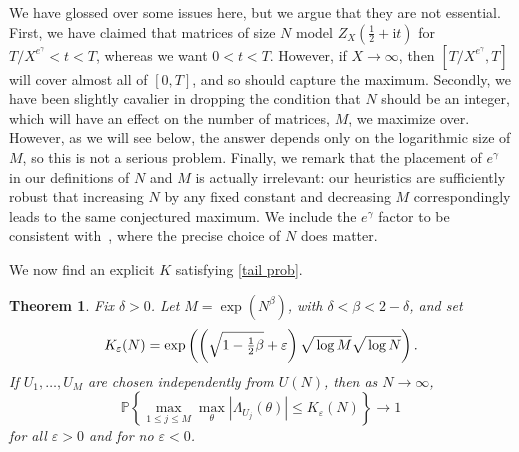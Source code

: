 \documentclass[10pt,reqno,twoside]{amsart}
\renewcommand{\i}{{\mathrm{i}}} %
\newcommand{\Prob}{\mathbb{P}}
\newtheorem{theorem}{Theorem}[section]
\numberwithin{equation}{section}
\numberwithin{theorem}{section}
\begin{document}
{{We have glossed over some issues here, but we argue that they are
not essential. First, we have claimed that matrices of size $N$
model $Z_X(\frac12+ \i t)$ for   $T /X^{e^\gamma} < t< T$,
whereas we want $0<t<T$. However, if $X\to\infty$,
then $[T /X^{e^\gamma}, T]$ will
cover almost all of $[0,T]$, and so should capture
the maximum. Secondly, we have been slightly cavalier in dropping
the condition that $N$ should be an integer, which will have an
effect on the number of matrices, $M$, we maximize over. However,  as we
will see below, the answer depends only on the logarithmic size of
$M$, so this is not a serious problem.  Finally, we remark that  the
placement of $e^\gamma$ in our definitions of $N$ and $M$  is actually
irrelevant: our heuristics are sufficiently robust that
increasing $N$ by any fixed constant and decreasing $M$
correspondingly leads to the same conjectured maximum.  We include
the $e^\gamma$ factor to be consistent with~\cite{GHK}, where
the precise choice of $N$ does matter.

We now find an explicit $K$ satisfying \eqref{tail prob}.
\begin{theorem}\label{thm:max size max Lambda}
Fix $\delta>0$. Let $M=\exp(N^\beta)$, with
$\delta<\beta<2-\delta$, and set
\begin{equation}\label{eq:K}
K_\varepsilon(N)=\exp\left(
\left(\sqrt{\mathstrut 1-\tfrac12\beta}+\varepsilon\right) \sqrt{\mathstrut \log M}
\sqrt{\mathstrut \log N} \right) .
\end{equation}
If $U_1,\dots,U_M$ are chosen independently from $U(N)$, then as
$N\to\infty$,
\begin{equation}
\Prob\left\{ \max_{1\leq j \leq M} \max_{\theta}
|\Lambda_{U_j}(\theta)| \leq K_\varepsilon(N) \right\} \to 1
\end{equation}
for all $\varepsilon>0$ and for no $\varepsilon<0$.
\end{theorem}

}}
\end{document}

